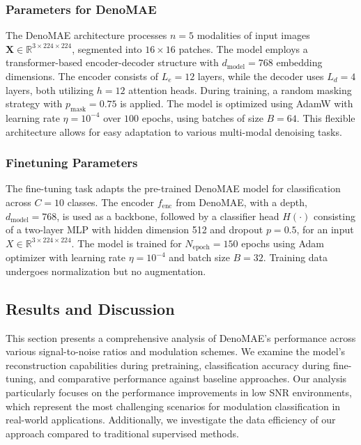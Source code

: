 \subsubsection{Parameters for DenoMAE}

The DenoMAE architecture processes $n=5$ modalities of input images $\mathbf{X} \in \mathbb{R}^{3 \times 224 \times 224}$, segmented into $16 \times 16$ patches. The model employs a transformer-based encoder-decoder structure with $d_\text{model} = 768$ embedding dimensions. The encoder consists of $L_e = 12$ layers, while the decoder uses $L_d = 4$ layers, both utilizing $h = 12$ attention heads. During training, a random masking strategy with $p_\text{mask} = 0.75$ is applied. The model is optimized using AdamW with learning rate $\eta = 10^{-4}$ over $100$ epochs, using batches of size $B = 64$. This flexible architecture allows for easy adaptation to various multi-modal denoising tasks.

\subsubsection{Finetuning Parameters}

The fine-tuning task adapts the pre-trained DenoMAE model for classification across $C = 10$ classes. The encoder $f_{\textrm{enc}}$ from DenoMAE, with a depth, $d_\text{model} = 768$, is used as a backbone, followed by a classifier head $H(\cdot)$ consisting of a two-layer MLP with hidden dimension 512 and dropout $p = 0.5$, for an input $X \in \mathbb{R}^{3 \times 224 \times 224}$. The model is trained for $N_{\textrm{epoch}} = 150$ epochs using Adam optimizer with learning rate $\eta = 10^{-4}$ and batch size $B = 32$. Training data undergoes normalization but no augmentation.

\subsection{Results and Discussion}

This section presents a comprehensive analysis of DenoMAE's performance across various signal-to-noise ratios and modulation schemes. We examine the model's reconstruction capabilities during pretraining, classification accuracy during fine-tuning, and comparative performance against baseline approaches. Our analysis particularly focuses on the performance improvements in low SNR environments, which represent the most challenging scenarios for modulation classification in real-world applications. Additionally, we investigate the data efficiency of our approach compared to traditional supervised methods.

